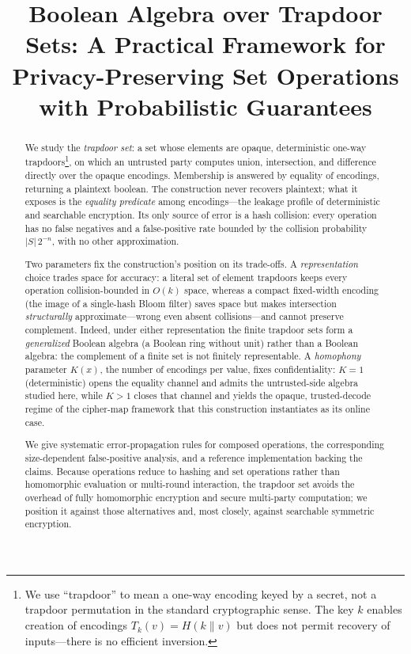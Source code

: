 \documentclass[10pt,conference]{IEEEtran}
\begin{document}
\title{Boolean Algebra over Trapdoor Sets: A Practical Framework for\\Privacy-Preserving Set Operations with Probabilistic Guarantees}

\author{
}

\maketitle

\begin{abstract}
We study the \emph{trapdoor set}: a set whose elements are opaque, deterministic one-way trapdoors\footnote{We use ``trapdoor'' to mean a one-way encoding keyed by a secret, not a trapdoor permutation in the standard cryptographic sense. The key $k$ enables creation of encodings $T_k(v) = H(k \| v)$ but does not permit recovery of inputs---there is no efficient inversion.}, on which an untrusted party computes union, intersection, and difference directly over the opaque encodings. Membership is answered by equality of encodings, returning a plaintext boolean. The construction never recovers plaintext; what it exposes is the \emph{equality predicate} among encodings---the leakage profile of deterministic and searchable encryption. Its only source of error is a hash collision: every operation has no false negatives and a false-positive rate bounded by the collision probability $|S|\,2^{-n}$, with no other approximation.

Two parameters fix the construction's position on its trade-offs. A \emph{representation} choice trades space for accuracy: a literal set of element trapdoors keeps every operation collision-bounded in $O(k)$ space, whereas a compact fixed-width encoding (the image of a single-hash Bloom filter) saves space but makes intersection \emph{structurally} approximate---wrong even absent collisions---and cannot preserve complement. Indeed, under either representation the finite trapdoor sets form a \emph{generalized} Boolean algebra (a Boolean ring without unit) rather than a Boolean algebra: the complement of a finite set is not finitely representable. A \emph{homophony} parameter $K(x)$, the number of encodings per value, fixes confidentiality: $K = 1$ (deterministic) opens the equality channel and admits the untrusted-side algebra studied here, while $K > 1$ closes that channel and yields the opaque, trusted-decode regime of the cipher-map framework that this construction instantiates as its online case.

We give systematic error-propagation rules for composed operations, the corresponding size-dependent false-positive analysis, and a reference implementation backing the claims. Because operations reduce to hashing and set operations rather than homomorphic evaluation or multi-round interaction, the trapdoor set avoids the overhead of fully homomorphic encryption and secure multi-party computation; we position it against those alternatives and, most closely, against searchable symmetric encryption.
\end{abstract}
\end{document}
